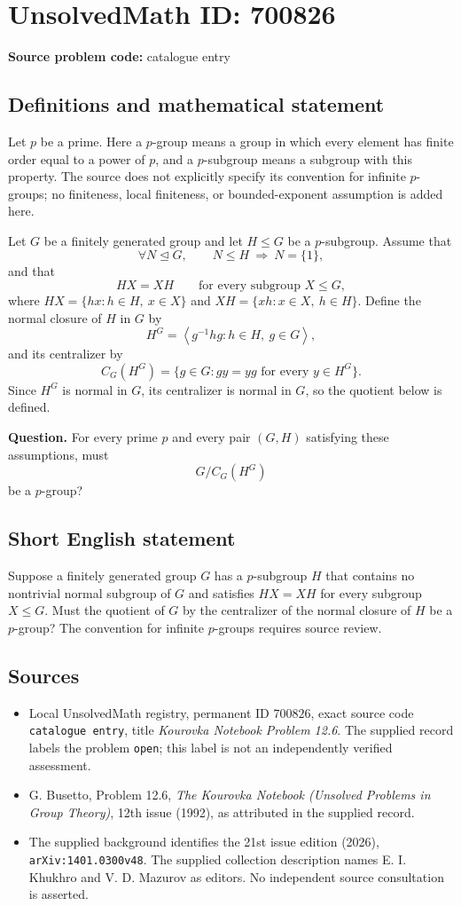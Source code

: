 \documentclass[11pt]{article}
\begin{document}
\section*{UnsolvedMath ID: 700826}
\textbf{Source problem code:} catalogue entry
\subsection{Definitions and mathematical statement}
Let \(p\) be a prime. Here a \(p\)-group means a group in which every element has finite order equal to a power of \(p\), and a \(p\)-subgroup means a subgroup with this property. The source does not explicitly specify its convention for infinite \(p\)-groups; no finiteness, local finiteness, or bounded-exponent assumption is added here.

Let \(G\) be a finitely generated group and let \(H\leq G\) be a \(p\)-subgroup. Assume that
\[
\forall N\trianglelefteq G,\qquad N\leq H\ \Longrightarrow\ N=\{1\},
\]
and that
\[
HX=XH\qquad\text{for every subgroup }X\leq G,
\]
where \(HX=\{hx:h\in H,\ x\in X\}\) and \(XH=\{xh:x\in X,\ h\in H\}\).
Define the normal closure of \(H\) in \(G\) by
\[
H^G=\left\langle g^{-1}hg:h\in H,\ g\in G\right\rangle,
\]
and its centralizer by
\[
C_G(H^G)=\{g\in G:gy=yg\text{ for every }y\in H^G\}.
\]
Since \(H^G\) is normal in \(G\), its centralizer is normal in \(G\), so the quotient below is defined.

\textbf{Question.} For every prime \(p\) and every pair \((G,H)\) satisfying these assumptions, must
\[
G/C_G(H^G)
\]
be a \(p\)-group?
\subsection{Short English statement}
Suppose a finitely generated group \(G\) has a \(p\)-subgroup \(H\) that contains no nontrivial normal subgroup of \(G\) and satisfies \(HX=XH\) for every subgroup \(X\leq G\). Must the quotient of \(G\) by the centralizer of the normal closure of \(H\) be a \(p\)-group? The convention for infinite \(p\)-groups requires source review.
\subsection{Sources}
\begin{itemize}
\item Local UnsolvedMath registry, permanent ID \(700826\), exact source code \texttt{catalogue entry}, title \emph{Kourovka Notebook Problem 12.6}. The supplied record labels the problem \texttt{open}; this label is not an independently verified assessment.
\item G. Busetto, Problem 12.6, \emph{The Kourovka Notebook (Unsolved Problems in Group Theory)}, 12th issue (1992), as attributed in the supplied record.
\item The supplied background identifies the 21st issue edition (2026), \texttt{arXiv:1401.0300v48}. The supplied collection description names E. I. Khukhro and V. D. Mazurov as editors. No independent source consultation is asserted.
\end{itemize}
\end{document}
